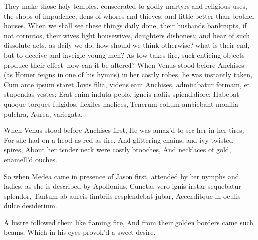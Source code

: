 {They make those holy temples, consecrated to godly martyrs and
religious uses, the shops of impudence, dens of whores and thieves, and
little better than brothel houses. When we shall see these things daily
done, their husbands bankrupts, if not cornutos, their wives light
housewives, daughters dishonest; and hear of such dissolute acts, as
daily we do, how should we think otherwise? what is their end, but to
deceive and inveigle young men? As tow takes fire, such enticing
objects produce their effect, how can it be altered? When Venus stood
before Anchises (as Homer feigns in one of his hymns) in her
costly robes, he was instantly taken,
Cum ante ipsum staret Jovis filia, videns eam
Anchises, admirabatur formam, et stupendas vestes;
Erat enim induta peplo, igneis radiis spiendidiore;
Habebat quoque torques fulgidos, flexiles haelices,
Tenerum collum ambiebant monilia pulchra,
Aurea, variegata.---

When Venus stood before Anchises first,
He was amaz'd to see her in her tires;
For she had on a hood as red as fire,
And glittering chains, and ivy-twisted spires,
About her tender neck were costly brooches,
And necklaces of gold, enamell'd ouches.

So when Medea came in presence of Jason first, attended by her nymphs
and ladies, as she is described by Apollonius,
Cunctas vero ignis instar sequebatur splendor,
Tantum ab aureis fimbriis resplendebat jubar,
Accenditque in oculis dulce desiderium.

A lustre followed them like flaming fire,
And from their golden borders came such beams,
Which in his eyes provok'd a sweet desire.

}
